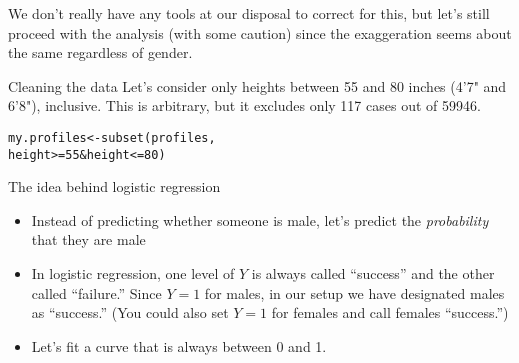 \documentclass{beamer}\usepackage[]{graphicx}\usepackage[]{color}
\makeatletter
\def\maxwidth{ %
  \ifdim\Gin@nat@width>\linewidth
    \linewidth
  \else
    \Gin@nat@width
  \fi
}
\newcommand{\hlnum}[1]{\textcolor[rgb]{0.824,0.412,0.118}{#1}}%
\newcommand{\hlstr}[1]{\textcolor[rgb]{1,0.894,0.71}{#1}}%
\newcommand{\hlopt}[1]{\textcolor[rgb]{1,0.894,0.769}{#1}}%
\newcommand{\hlstd}[1]{\textcolor[rgb]{1,0.894,0.769}{#1}}%
\newcommand{\hlkwb}[1]{\textcolor[rgb]{0.804,0.776,0.451}{#1}}%
\newcommand{\hlkwc}[1]{\textcolor[rgb]{0.78,0.941,0.545}{#1}}%
\newcommand{\hlkwd}[1]{\textcolor[rgb]{1,0.78,0.769}{#1}}%
\newenvironment{kframe}{%
 \def\at@end@of@kframe{}%
 \ifinner\ifhmode%
  \def\at@end@of@kframe{\end{minipage}}%
  \begin{minipage}{\columnwidth}%
 \fi\fi%
 \def\FrameCommand##1{\hskip\@totalleftmargin \hskip-\fboxsep
 \colorbox{shadecolor}{##1}\hskip-\fboxsep
     \hskip-\linewidth \hskip-\@totalleftmargin \hskip\columnwidth}%
 \MakeFramed {\advance\hsize-\width
   \@totalleftmargin\z@ \linewidth\hsize
   \@setminipage}}%
 {\par\unskip\endMakeFramed%
 \at@end@of@kframe}
\newenvironment{knitrout}{}{} %
\makeatother
\begin{document}
\begin{darkframes}
    \begin{frame}
    \end{frame}

    \begin{frame}
      \begin{center}
        We don't really have any tools at our disposal to correct for this, but let's still proceed with the analysis (with some caution) since the exaggeration seems about the same regardless of gender.
      \end{center}
    \end{frame}


    \begin{frame}[fragile]{Cleaning the data}
      Let's consider only heights between 55 and 80 inches (4'7" and 6'8"), inclusive. This is arbitrary, but it excludes only 117 cases out of 59946.
\begin{knitrout}
\color{fgcolor}\begin{kframe}
\begin{alltt}
\hlstd{my.profiles} \hlkwb{<-} \hlkwd{subset}\hlstd{(profiles,}
                 \hlstd{height} \hlopt{>=} \hlnum{55} \hlopt{&} \hlstd{height} \hlopt{<=} \hlnum{80}\hlstd{)}
\end{alltt}
\end{kframe}
\end{knitrout}
    \end{frame}

    \begin{frame}{The idea behind logistic regression}
      \begin{itemize}
        \item Instead of predicting whether someone is male, let's predict the \emph{probability} that they are male
        \item In logistic regression, one level of $Y$ is always called ``success'' and the other called ``failure.'' Since $Y=1$ for males, in our setup we have designated males as ``success.'' (You could also set $Y=1$ for females and call females ``success.'')
        \item Let's fit a curve that is always between 0 and 1.
      \end{itemize}
    \end{frame}


\end{darkframes}
\end{document}
